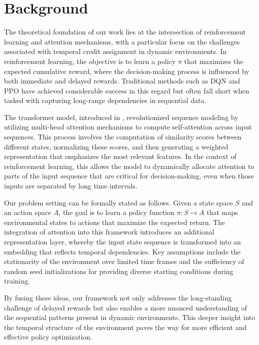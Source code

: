 \documentclass{article} %
\begin{document}
\section{Background}
\label{sec:background}
The theoretical foundation of our work lies at the intersection of reinforcement learning and attention mechanisms, with a particular focus on the challenges associated with temporal credit assignment in dynamic environments. In reinforcement learning, the objective is to learn a policy \(\pi\) that maximizes the expected cumulative reward, where the decision-making process is influenced by both immediate and delayed rewards. Traditional methods such as DQN \cite{mnih_2015_dqn} and PPO \cite{schulman_2017_ppo} have achieved considerable success in this regard but often fall short when tasked with capturing long-range dependencies in sequential data.

The transformer model, introduced in \cite{ashish_2017_attention}, revolutionized sequence modeling by utilizing multi-head attention mechanisms to compute self-attention across input sequences. This process involves the computation of similarity scores between different states, normalizing these scores, and then generating a weighted representation that emphasizes the most relevant features. In the context of reinforcement learning, this allows the model to dynamically allocate attention to parts of the input sequence that are critical for decision-making, even when those inputs are separated by long time intervals.

Our problem setting can be formally stated as follows. Given a state space \(S\) and an action space \(A\), the goal is to learn a policy function \(\pi: S \rightarrow A\) that maps environmental states to actions that maximize the expected return. The integration of attention into this framework introduces an additional representation layer, whereby the input state sequence is transformed into an embedding that reflects temporal dependencies. Key assumptions include the stationarity of the environment over limited time frames and the sufficiency of random seed initializations for providing diverse starting conditions during training.

By fusing these ideas, our framework not only addresses the long-standing challenge of delayed rewards but also enables a more nuanced understanding of the sequential patterns present in dynamic environments. This deeper insight into the temporal structure of the environment paves the way for more efficient and effective policy optimization.
\end{document}

